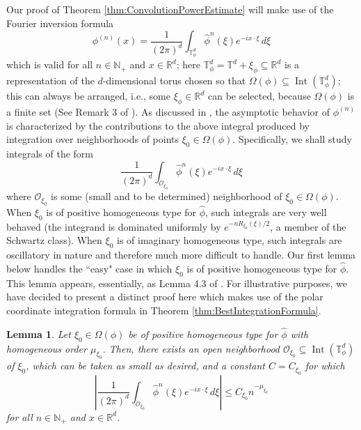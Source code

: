 \documentclass[11pt]{article}
\newtheorem{lemma}[theorem]{Lemma}
\theoremstyle{remark}
\newcommand\Interior{\operatorname{Int}}
\begin{document}
\noindent Our proof of Theorem \ref{thm:ConvolutionPowerEstimate} will make use of the Fourier inversion formula
\begin{equation}\label{eq:FourierInversionConvolutionPower}
\phi^{(n)}(x)=\frac{1}{(2\pi)^d}\int_{\mathbb{T}_\phi^d}\widehat{\phi}^n(\xi)e^{-ix\cdot\xi}\,d\xi
\end{equation}
which is valid for all $n\in\mathbb{N}_+$ and $x\in\mathbb{R}^d$; here $\mathbb{T}_\phi^d=\mathbb{T}^d+\xi_\phi\subseteq\mathbb{R}^d$
is a representation of the $d$-dimensional torus chosen so that $\Omega(\phi)\subseteq \Interior(\mathbb{T}_{\phi}^d)$; this can always be arranged, i.e., some $\xi_\phi\in\mathbb{R}^d$ can be selected, because $\Omega(\phi)$ is a finite set (See Remark 3 of \cite{randles_convolution_2017}). As discussed in \cite{randles_convolution_2017}, the asymptotic behavior of $\phi^{(n)}$ is characterized by the contributions to the above integral produced by integration over neighborhoods of points $\xi_0\in\Omega(\phi).$ Specifically, we shall study integrals of the form
\begin{equation}\label{eq:LocalizedFourierInversionConvolutionPower}
\frac{1}{(2\pi)^d}\int_{\mathcal{O}_{\xi_0}}\widehat{\phi}^n(\xi)e^{-ix\cdot\xi}\,d\xi
\end{equation}
where $\mathcal{O}_{\xi_0}$ is some (small and to be determined) neighborhood of $\xi_0\in\Omega(\phi)$. When $\xi_0$ is of positive homogeneous type for $\widehat{\phi}$, such integrals are very well behaved (the integrand is dominated uniformly by $e^{-nR_{\xi_0}(\xi)/2}$, a member of the Schwartz class). When $\xi_0$ is of imaginary homogeneous type, such integrals are oscillatory in nature and therefore much more difficult to handle. Our first lemma below handles the ``easy" case in which $\xi_0$ is of positive homogeneous type for $\widehat{\phi}$. This lemma appears, essentially, as Lemma 4.3 of \cite{randles_convolution_2017}. For illustrative purposes, we have decided to present a distinct proof here which makes use of the polar coordinate integration formula in Theorem \ref{thm:BestIntegrationFormula}. 
\begin{lemma}\label{lem:EstPosHom}
Let $\xi_0\in\Omega(\phi)$ be of positive homogeneous type for $\widehat{\phi}$ with homogeneous order $\mu_{\xi_0}$. Then, there exists an open neighborhood $\mathcal{O}_{\xi_0}\subseteq\Interior(\mathbb{T}^d_\phi)$ of $\xi_0$, which can be taken as small as desired, and a constant $C=C_{\xi_0}$ for which
\begin{equation*}
    \left|\frac{1}{(2\pi)^d}\int_{\mathcal{O}_{\xi_0}}\widehat{\phi}^n(\xi)e^{-ix\cdot\xi}\,d\xi\right|\leq 
    C_{\xi_0} n^{-\mu_{\xi_0}}
\end{equation*}
for all $n\in\mathbb{N}_+$ and $x\in\mathbb{R}^d$.
\end{lemma}
\end{document}
